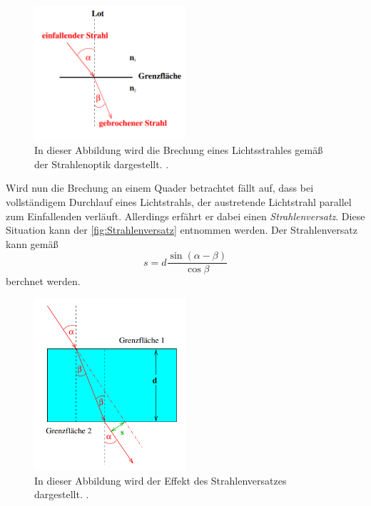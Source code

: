 \begin{figure}
  \centering
  \includegraphics[width=0.5\textwidth]{content/Brechung.png}
  \caption{In dieser Abbildung wird die Brechung eines Lichtsstrahles gemäß der Strahlenoptik dargestellt. \cite{v400}.}
  \label{fig:Brechung}
\end{figure}

Wird nun die Brechung an einem Quader betrachtet fällt auf, dass bei vollständigem Durchlauf eines Lichtstrahls, der austretende Lichtstrahl parallel zum Einfallenden verläuft.
Allerdings erfährt er dabei einen \textit{Strahlenversatz}. Diese Situation kann der \autoref{fig:Strahlenversatz} entnommen werden.
Der Strahlenversatz kann gemäß
\begin{equation}
  \label{eqn:Strahlenversatz}
  s = d\frac{\sin(\alpha - \beta)}{\cos\beta}
\end{equation}
berchnet werden.

\begin{figure}
  \centering
  \includegraphics[width=0.5\textwidth]{content/Quader.png}
  \caption{In dieser Abbildung wird der Effekt des Strahlenversatzes dargestellt. \cite{v400}.}
  \label{fig:Strahlenversatz}
\end{figure}

